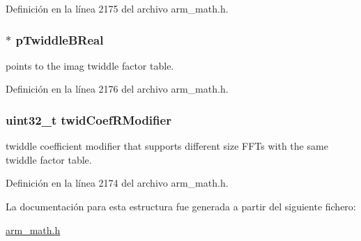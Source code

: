 Definición en la línea 2175 del archivo arm\+\_\+math.\+h.

\subsubsection[{\texorpdfstring{p\+Twiddle\+B\+Real}{pTwiddleBReal}}]{$\ast$ p\+Twiddle\+B\+Real}\hypertarget{structarm__rfft__instance__q31_a611c385424ce77519f599980f96d5846}{}\label{structarm__rfft__instance__q31_a611c385424ce77519f599980f96d5846}
points to the imag twiddle factor table. 

Definición en la línea 2176 del archivo arm\+\_\+math.\+h.

\subsubsection[{\texorpdfstring{twid\+Coef\+R\+Modifier}{twidCoefRModifier}}]{\setlength{\rightskip}{0pt plus 5cm}uint32\+\_\+t twid\+Coef\+R\+Modifier}\hypertarget{structarm__rfft__instance__q31_a5b06f7f76c018db993fe6acc5708c589}{}\label{structarm__rfft__instance__q31_a5b06f7f76c018db993fe6acc5708c589}
twiddle coefficient modifier that supports different size F\+F\+Ts with the same twiddle factor table. 

Definición en la línea 2174 del archivo arm\+\_\+math.\+h.



La documentación para esta estructura fue generada a partir del siguiente fichero\+:\begin{DoxyCompactItemize}
\item 
\hyperlink{arm__math_8h}{arm\+\_\+math.\+h}\end{DoxyCompactItemize}
